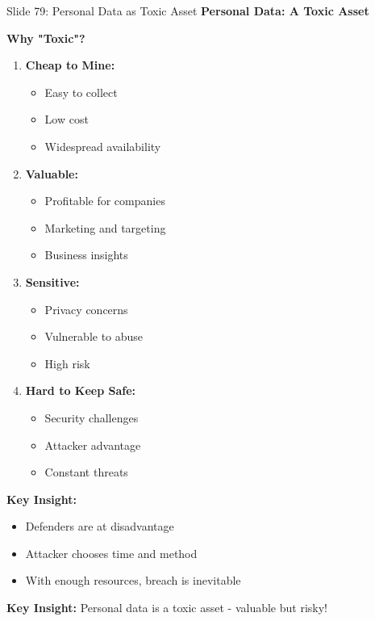 \documentclass[8pt]{beamer}
\begin{document}
	\begin{frame}{Slide 79: Personal Data as Toxic Asset}
		\fontsize{6.5}{7.5}\selectfont
		\textbf{Personal Data: A Toxic Asset}
		
		\vspace{0.1cm}
		\textbf{Why "Toxic"?}
		\begin{enumerate}
			\item \textbf{Cheap to Mine:}
			\begin{itemize}
				\item Easy to collect
				\item Low cost
				\item Widespread availability
			\end{itemize}
			\item \textbf{Valuable:}
			\begin{itemize}
				\item Profitable for companies
				\item Marketing and targeting
				\item Business insights
			\end{itemize}
			\item \textbf{Sensitive:}
			\begin{itemize}
				\item Privacy concerns
				\item Vulnerable to abuse
				\item High risk
			\end{itemize}
			\item \textbf{Hard to Keep Safe:}
			\begin{itemize}
				\item Security challenges
				\item Attacker advantage
				\item Constant threats
			\end{itemize}
		\end{enumerate}
		
		\vspace{0.1cm}
		\textbf{Key Insight:}
		\begin{itemize}
			\item Defenders are at disadvantage
			\item Attacker chooses time and method
			\item With enough resources, breach is inevitable
		\end{itemize}
		
		\textcolor{myblue}{\textbf{Key Insight:}} Personal data is a \textcolor{myblue}{toxic asset} - valuable but risky!
	\end{frame}
	
\end{document}
